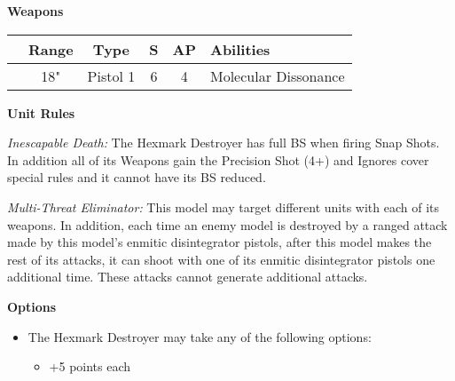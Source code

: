 \begin{minipage}[t]{0.72\textwidth}
	\vspace*{2em}
	\textbf{Weapons}
	
	\begin{tabular}{m{95 pt} *{4}{c} >{\raggedright\arraybackslash}p{130pt}}
		& Range & Type & S & AP & Abilities \\
		\hline
		\quickref{Enmitic Disintegrator Pistol} & 18" & Pistol 1 & 6 & 4 & Molecular Dissonance \\
	\end{tabular}
	
	\vspace*{2em}
	\textbf{Unit Rules}
		
	\textit{Inescapable Death:} The Hexmark Destroyer has full BS when firing Snap Shots. In addition all of its Weapons gain the Precision Shot (4+) and Ignores cover special rules and it cannot have its BS reduced.
	
	\textit{Multi-Threat Eliminator:} This model may target different units with each of its weapons. In addition, each time an enemy model is destroyed by a ranged attack made by this model's enmitic disintegrator pistols, after this model makes the rest of its attacks, it can shoot with one of its enmitic disintegrator pistols one additional time. These attacks cannot generate additional attacks.
		
	\vspace*{2em}
	\textbf{Options}
	\begin{itemize}
		\item The Hexmark Destroyer may take any of the following options:
		\begin{itemize}
			\item {} \dotfill +5 points each
		\end{itemize}
	\end{itemize}
\end{minipage}
\hspace{0.5em}


\newpage
\subsubsection[Skorpekh Destroyer Vanguard]{}

